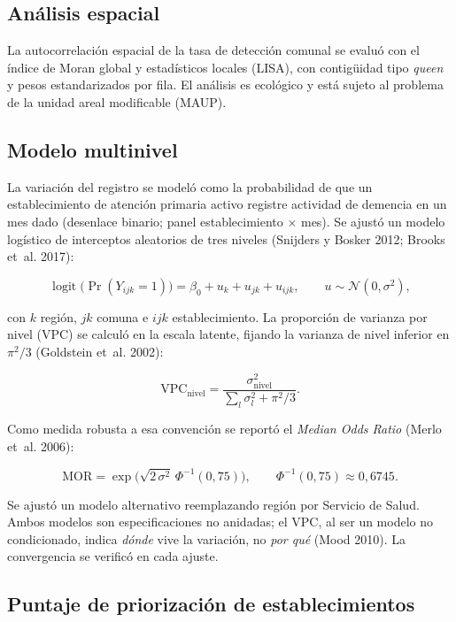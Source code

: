 \documentclass[
  spanish,
  letterpaper,
  DIV=11,
  numbers=noendperiod]{scrartcl}
\begin{document}
\subsection{Análisis espacial}\label{anuxe1lisis-espacial}

La autocorrelación espacial de la tasa de detección comunal se evaluó
con el índice de Moran global y estadísticos locales (LISA), con
contigüidad tipo \emph{queen} y pesos estandarizados por fila. El
análisis es ecológico y está sujeto al problema de la unidad areal
modificable (MAUP).

\subsection{Modelo multinivel}\label{modelo-multinivel}

La variación del registro se modeló como la probabilidad de que un
establecimiento de atención primaria activo registre actividad de
demencia en un mes dado (desenlace binario; panel establecimiento ×
mes). Se ajustó un modelo logístico de interceptos aleatorios de tres
niveles (Snijders y Bosker 2012; {Brooks et~al.} 2017):

\[\operatorname{logit}\big(\Pr(Y_{ijk}=1)\big) = \beta_0 + u_k + u_{jk} + u_{ijk}, \qquad u \sim \mathcal{N}(0,\sigma^2),\]

con \(k\) región, \(jk\) comuna e \(ijk\) establecimiento. La proporción
de varianza por nivel (VPC) se calculó en la escala latente, fijando la
varianza de nivel inferior en \(\pi^2/3\) (Goldstein et~al. 2002):

\[\text{VPC}_{\text{nivel}} = \frac{\sigma^2_{\text{nivel}}}{\sum_l \sigma^2_l + \pi^2/3}.\]

Como medida robusta a esa convención se reportó el \emph{Median Odds
Ratio} ({Merlo et~al.} 2006):

\[\text{MOR} = \exp\!\big(\sqrt{2\,\sigma^2}\,\Phi^{-1}(0{,}75)\big), \qquad \Phi^{-1}(0{,}75)\approx 0{,}6745.\]

Se ajustó un modelo alternativo reemplazando región por Servicio de
Salud. Ambos modelos son especificaciones no anidadas; el VPC, al ser un
modelo no condicionado, indica \emph{dónde} vive la variación, no
\emph{por qué} (Mood 2010). La convergencia se verificó en cada ajuste.

\subsection{Puntaje de priorización de
establecimientos}\label{puntaje-de-priorizaciuxf3n-de-establecimientos}
\end{document}
